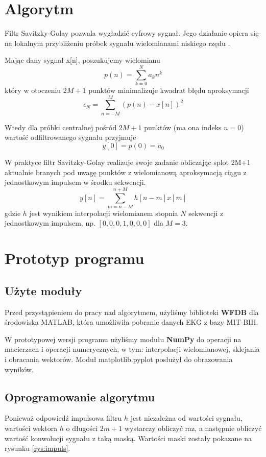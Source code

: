 \section{Algorytm}

Filtr Savitzky-Golay pozwala wygładzić cyfrowy sygnał. Jego działanie opiera się na lokalnym przybliżeniu próbek sygnału wielomianami niskiego rzędu \cite{whatissg}.

Mając dany sygnał x[n], poszukujemy wielomianu
\begin{equation}
p(n) = \sum\limits_{k=0}^N a_k n^k
\end{equation}
który w otoczeniu $2M+1$ punktów minimalizuje kwadrat błędu aproksymacji
\begin{equation}
\epsilon_N = \sum\limits_{n=-M}^M (p(n) - x[n])^2
\end{equation}

Wtedy dla próbki centralnej pośród $2M+1$ punktów (ma ona indeks $n=0$) wartość odfiltrowanego sygnału przyjmuje
\begin{equation}
y[0] = p(0) = a_0
\end{equation}

W praktyce filtr Savitzky-Golay realizuje swoje zadanie obliczając splot 2M+1 aktualnie branych pod uwagę punktów z wielomianową aproksymacją ciągu z jednostkowym impulsem w środku sekwencji.
\begin{equation}
y[n] = \sum\limits_{m=n-M}^{n+M} h[n-m] x[m]
\end{equation}
gdzie $h$ jest wynikiem interpolacji wielomianem stopnia $N$ sekwencji z jednostkowym impulsem, np. $[0, 0, 0, 1, 0, 0, 0]$ dla $M=3$.


\newpage
\section{Prototyp programu}
\subsection{Użyte moduły}
Przed przystąpieniem do pracy nad algorytmem, użyliśmy biblioteki \textbf{WFDB} dla środowiska MATLAB, która umożliwiła pobranie danych EKG z bazy MIT-BIH\cite{mit-bih}.

W prototypowej wersji programu użyliśmy modułu \textbf{NumPy} do operacji na macierzach i operacji numerycznych, w tym: interpolacji wielomianowej, sklejania i obracania wektorów. 
Moduł matplotlib.pyplot posłużył do obrazowania wyników.

\subsection{Oprogramowanie algorytmu}
Ponieważ odpowiedź impulsowa filtru $h$ jest niezależna od wartości sygnału, wartości wektora $h$ o długości $2m+1$ wystarczy obliczyć raz, a następnie obliczyć wartość konwolucji sygnału z taką maską. Wartości maski zostały pokazane na rysunku \ref{rys:impuls}.

